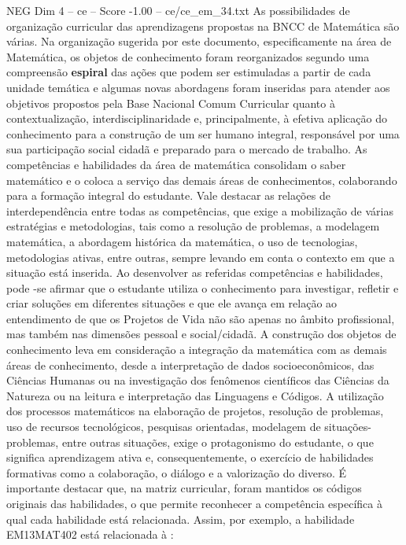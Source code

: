 \begin{textsample}{NEG Dim 4 – ce – Score -1.00 – ce/ce\_em\_34.txt}
As possibilidades de organização curricular das aprendizagens propostas na BNCC de Matemática são várias.
Na organização sugerida por este documento, especificamente na área de Matemática, os objetos de conhecimento foram reorganizados segundo uma compreensão \textbf{espiral} das ações que podem ser estimuladas a partir de cada unidade temática e algumas novas abordagens foram inseridas para atender aos objetivos propostos pela Base Nacional Comum Curricular quanto à contextualização, interdisciplinaridade e, principalmente, à efetiva aplicação do conhecimento para a construção de um ser humano integral, responsável por uma sua participação social cidadã e preparado para o mercado de trabalho.
As competências e habilidades da área de matemática consolidam o saber matemático e o coloca a serviço das demais áreas de conhecimentos, colaborando para a formação integral do estudante.
Vale destacar as relações de interdependência entre todas as competências, que exige a mobilização de várias estratégias e metodologias, tais como a resolução de problemas, a modelagem matemática, a abordagem histórica da matemática, o uso de tecnologias, metodologias ativas, entre outras, sempre levando em conta o contexto em que a situação está inserida.
Ao desenvolver as referidas competências e habilidades, pode -se afirmar que o estudante utiliza o conhecimento para investigar, refletir e criar soluções em diferentes situações e que ele avança em relação ao entendimento de que os Projetos de Vida não são apenas no âmbito profissional, mas também nas dimensões pessoal e social/cidadã.
A construção dos objetos de conhecimento leva em consideração a integração da matemática com as demais áreas de conhecimento, desde a interpretação de dados socioeconômicos, das Ciências Humanas ou na investigação dos fenômenos científicos das Ciências da Natureza ou na leitura e interpretação das Linguagens e Códigos.
A utilização dos processos matemáticos na elaboração de projetos, resolução de problemas, uso de recursos tecnológicos, pesquisas orientadas, modelagem de situações-problemas, entre outras situações, exige o protagonismo do estudante, o que significa aprendizagem ativa e, consequentemente, o exercício de habilidades formativas como a colaboração, o diálogo e a valorização do diverso.
É importante destacar que, na matriz curricular, foram mantidos os códigos originais das habilidades, o que permite reconhecer a competência específica à qual cada habilidade está relacionada.
Assim, por exemplo, a habilidade EM13MAT402 está relacionada à :

\end{textsample}
